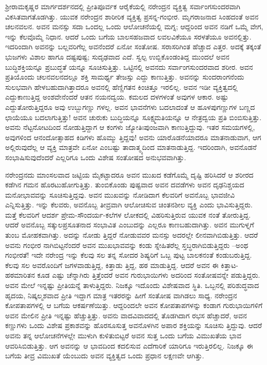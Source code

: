 ಶ್ರೀರಾಮಕೃಷ್ಣರ ಮಾರ್ಗದರ್ಶನದಲ್ಲಿ ಪ್ರೀತಿಪೂರ್ವಕ ಆರೈಕೆಯಲ್ಲಿ ನರೇಂದ್ರನ ವ್ಯಕ್ತಿತ್ವ ಸರ್ವಾಂಗಸುಂದರವಾಗಿ ವಿಕಸಿತವಾಗತೊಡಗಿತ್ತು. ಯುವಕ ನರೇಂದ್ರನ ಶಾರೀರಿಕ ವ್ಯಕ್ತಿತ್ವ ಪ್ರಸನ್ನ-ಗಂಭೀರ. ಮೃಗರಾಜನಾದ ಸಿಂಹದಂತೆ ಅವನ ಚಲನವಲನ. ಅವನ ಮನಸ್ಸು ಸದಾ ಒಂದಲ್ಲ ಒಂದು ಆಲೋಚನೆಯಲ್ಲಿ ಮಗ್ನ; ಆದ್ದರಿಂದ ಅವನ ನಡಿಗೆ ಒಮ್ಮೆ ವೇಗ, ಇನ್ನು ಕೆಲವೊಮ್ಮೆ ನಿಧಾನ. ಆದರೆ ಒಂದು ಬಗೆಯ ಬಾಲಸಹಜವಾದ ಲವಲವಿಕೆಯೂ ಸರಳತೆಯೂ ಅವನಲ್ಲಿತ್ತು. ಇದರಿಂದಾಗಿ ಅವನನ್ನು ಬಲ್ಲವರಿಗೆಲ್ಲ ಅವನೆಂದರೆ ಏನೋ ಸಂತೋಷ. ಸರಾಸರಿಗಿಂತ ಹೆಚ್ಚಾದ ಎತ್ತರ. ಅದಕ್ಕೆ ತಕ್ಕಂತೆ ಭುಜಗಳು ವಿಶಾಲ ಹಾಗೂ ದಷ್ಟಪುಷ್ಟ; ಸುದೃಢವಾದ ಎದೆ. ಸ್ವಲ್ಪ ಉಬ್ಬಿಕೊಂಡಂತಿದ್ದ ಮುಂದಲೆ ಅವನ ಬುದ್ಧಿಶಕ್ತಿಯನ್ನೂ ಪ್ರಬುದ್ಧತೆ ಯನ್ನೂ ಸೂಚಿಸುತ್ತಿತ್ತು. ಒಟ್ಟಿನಲ್ಲಿ ಅವನದು ಸರ್ವಾಂಗಸುಂದರವಾದ ಶರೀರ. ಅವನ ಪ್ರತಿಯೊಂದು ಚಲನವಲನದಲ್ಲೂ ಶಕ್ತಿ ಸಾಮರ್ಥ್ಯ ತೇಜಸ್ಸು ಎದ್ದು ಕಾಣುತ್ತಿತ್ತು. ಅವನನ್ನು ಸುಂದರಾಂಗನೆಂದು ಸುಲಭವಾಗಿ ಹೇಳಬಹುದಾಗಿತ್ತಾದರೂ ಅವನಲ್ಲಿ ಹೆಣ್ಣಿಗತನ ಕಿಂಚಿತ್ತೂ ಇರಲಿಲ್ಲ. ಅವನ ಇಡೀ ವ್ಯಕ್ತಿತ್ವದಲ್ಲಿ ಎದ್ದುಕಾಣುತ್ತಿದ್ದ ಅಂಶವೇನೆಂದರೆ ಆತನ ನಯನದ್ವಯ. ಕಮಲದ ದಳಗಳಂತೆ ಅವುಗಳ ಆಕಾರ. ಅಷ್ಟು ಎದ್ದುತೋರುತ್ತಿದ್ದರೂ ಅವು ಉಬ್ಬುಗಣ್ಣು ಗಳಲ್ಲ. ಅವನ ಭಾವನೆಗಳು ಬದಲಾದಂತೆ ಆ ಹೂಳಪುಗಣ್ಣುಗಳ ಬಣ್ಣದ ಛಾಯೆಯೂ ಬದಲಾಗುತ್ತಿತ್ತು! ಅವನ ಚುರುಕು ಬುದ್ಧಿಯನ್ನೂ ಸೂಕ್ಷ್ಮಮತಿಯನ್ನೂ ಆ ನೇತ್ರದ್ವಯ ಪ್ರತಿ ಬಿಂಬಿಸುತ್ತಿತ್ತು. ಅವನು ನೆಟ್ಟನೋಟದಿಂದ ನೋಡುತ್ತಿದ್ದಾಗ ಆ ಕಂಗಳು ಜ್ಯೋತಿಃಪುಂಜವಾಗಿ ಕಾಣುತ್ತಿದ್ದುವು. ಇತರ ಸಮಯಗಳಲ್ಲಿ, ಅವುಗಳಿಂದ ಆನಂದೋತ್ಸಾಹದ ಕಿಡಿಗಳು ಹೊಮ್ಮು ತ್ತಿದ್ದವು! ಅವನು ಯಾರೊಡನೆಯಾದರೂ ಮಾತನಾಡುವಾಗ, ಆಗ ಅಲ್ಲಿರುವುದೆಲ್ಲ ಆ ವ್ಯಕ್ತಿ ಮಾತ್ರವೇ ಏನೋ ಎಂಬಷ್ಟು ತಾದಾತ್ಮ್ಯದಿಂದ ಮಾತನಾಡುತ್ತಿದ್ದ. ಇದರಿಂದಾಗಿ, ಅವನೊಡನೆ ಸಂಭಾಷಿಸುವುದೆಂದರೆ ಎಲ್ಲರಿಗೂ ಒಂದು ವಿಶೇಷ ಸಂತೋಷದ ಅನುಭವವಾಗಿತ್ತು.

ನರೇಂದ್ರನದು ಮಾಂಸಲವಾದ ಜಟ್ಟಿಯ ಮೈಕಟ್ಟಾದರೂ ಅವನ ಮುಖದ ಕಡೆಗೊಮ್ಮೆ ದೃಷ್ಟಿ ಹರಿಸಿದರೆ ಆ ಶರೀರದ ಕಡೆಗಿನ ಗಮನ ಹೊರಟುಹೋಗುತ್ತಿತ್ತು. ತುಂಬಿಕೊಂಡು ಪುಷ್ಟವಾದ ಅವನ ದವಡೆಗಳು ಅವನ ದೃಢನಿಶ್ಚಯದ ಮನೋಭಾವವನ್ನು ಸೂಚಿಸುತ್ತಿದ್ದವು. ಅವನ ಮುಖವನ್ನು ನೋಡಿದಾಗ ಕೆಲವರಿಗೆ ಅವನೊಬ್ಬ ಭಾವಜೀವಿ ಎನ್ನಿಸುತ್ತಿತ್ತು. ಇನ್ನು ಕೆಲವರು, ಅವನೊಬ್ಬ ತೀವ್ರವಾಗಿ ಆಲೋಚಿಸುವ ಚಿಂತನಶೀಲ ವ್ಯಕ್ತಿ ಎಂದು ಭಾವಿಸುತ್ತಿದ್ದರು. ಮತ್ತೆ ಕೆಲವರಿಗೆ ಆದರ್ಶ ಪ್ರೇಮ-ಸೌಂದರ್ಯ-ಕಲೆಗಳ ಲೋಕದಲ್ಲಿ ವಿಹರಿಸುತ್ತಿರುವ ಯುವಕ ನಂತೆ ತೋರುತ್ತಿದ್ದ. ಆದರೆ ಅವನೊಬ್ಬ ಸತ್ಕುಲಪ್ರಸೂತನಾದ ಸಂಭಾವಿತ ಎಂಬುದನ್ನು ಎಲ್ಲರೂ ಕಾಣಬಹುದಾಗಿತ್ತು. ಅವನ ಮುಗುಳ್ನಗೆ ತುಂಬ ಮೋಹಕವಾಗಿತ್ತು. ಅದನ್ನು ನೋಡು ತ್ತಿದ್ದರೆ ನೋಡುವವರ ಮನಸ್ಸು ಅದರಲ್ಲೇ ಲೀನವಾಗಿಬಿಡುತ್ತಿತ್ತು. ಆದರೆ ಅವನು ಗಂಭೀರ ನಾಗಿಬಿಟ್ಟನೆಂದರೆ ಅವನ ಮುಖಭಾವವನ್ನು ಕಂಡು ಸ್ನೇಹಿತರೆಲ್ಲ ಸ್ತಬ್ಧರಾಗಿಬಿಡುತ್ತಿದ್ದರು –ಅಂಥ ಗಂಭೀರತೆ! ಇದೇ ನರೇಂದ್ರ ಇನ್ನು ಕೆಲವು ಸಲ ತನ್ನ ಸೋದರ ಶಿಷ್ಯರಿಗೆ ಒಬ್ಬ ಪುಟ್ಟ ಬಾಲಕನಂತೆ ಕಂಡುಬರುತ್ತಿದ್ದ. ಕೆಲವು ಸಲ ಅವರೊಂದಿಗೆ ಜಗಳವಾಡುತ್ತಿದ್ದ, ಕಿತ್ತಾಡು ತ್ತಿದ್ದ, ಹಠ ಮಾಡುತ್ತಿದ್ದ. ಆದರೆ ಅವನ ಈ ಕಿತ್ತಾಟ-ಹಠಮಾರಿತನ ಕೂಡ ಎಷ್ಟು ಚೆನ್ನಾಗಿರು ತ್ತಿತ್ತೆಂದರೆ ಅವನ ಗುರುಭಾಯಿಗಳು ಅದರಿಂದ ಸಂತೋಷವನ್ನೇ ಪಡುತ್ತಿದ್ದರು. ಅವನ ಮೇಲೆ ಇನ್ನಷ್ಟು ಪ್ರೀತಿಯನ್ನೆ ತಾಳುತ್ತಿದ್ದರು. ನಿಜಕ್ಕೂ ಇದೊಂದು ವಿಶೇಷವಾದ ಸ್ಥಿತಿ. ಒಬ್ಬನಲ್ಲಿ ಪರಿಶುದ್ಧವಾದ ಹೃದಯ, ನಿಷ್ಕಲ್ಮಶವಾದ ಪ್ರೀತಿ ಇದ್ದಾಗ ಮಾತ್ರ ಇತರರನ್ನು ಹೀಗೆ ಸಂತೋಷ ವಾಗಿಡಲು ಸಾಧ್ಯ. ನರೇಂದ್ರನ ಕೋಪತಾಪಗಳಲ್ಲಿ ಆ ಬಗೆಯ ಆಕರ್ಷಣೆಯಿತ್ತು. ಆದ್ದರಿಂದಲೇ ಅವನ ಕೋಪತಾಪಗಳನ್ನು ಕಂಡಾಗ ಗುರುಭಾಯಿಗಳಿಗೆ ಅವನ ಮೇಲಿನ ಪ್ರೀತಿ ಇನ್ನಷ್ಟು ಹೆಚ್ಚುತ್ತಿತ್ತು. ಅವನು ವಾದವಿವಾದದಲ್ಲಿ ತೊಡಗಿದಾಗ ರಭಸ ಹೆಚ್ಚಾದರೆ, ಅವನ ಕಣ್ಣುಗಳು ಒಂದು ವಿಶೇಷ ಪ್ರಕಾಶವನ್ನು ಹೊರಸೂಸುತ್ತ ಅವನೊಳಗಿನ ಅಪಾರ ಶಕ್ತಿಯನ್ನು ಸೂಚಿಸು ತ್ತಿದ್ದುವು. ಆದರೆ ಅವನು ತನ್ನ ಆಲೋಚನೆಗಳಲ್ಲೇ ಮುಳುಗಿ ಕುಳಿತುಬಿಟ್ಟರೆ ಅವನ ಸುತ್ತ ಒಂದು ಬಗೆಯ ವಿಮುಖತೆಯ ಭಾವ ಆವರಿಸಿಬಿಡುತ್ತಿತ್ತು. ಆಗ ಅವನನ್ನು ಆ ಭಾವದಿಂದ ಕದಲಿಸುವ ಎದೆಗಾರಿಕೆ ಯಾರಿಗೂ ಇರುತ್ತಿರಲಿಲ್ಲ. ನಿಜಕ್ಕೂ ಈ ಬಗೆಯ ತೀವ್ರ ವಿಮುಖತೆ ಯೆಂಬುದು ಅವನ ವ್ಯಕ್ತಿತ್ವದ ಒಂದು ಪ್ರಧಾನ ಲಕ್ಷಣವೇ ಆಗಿತ್ತು.

